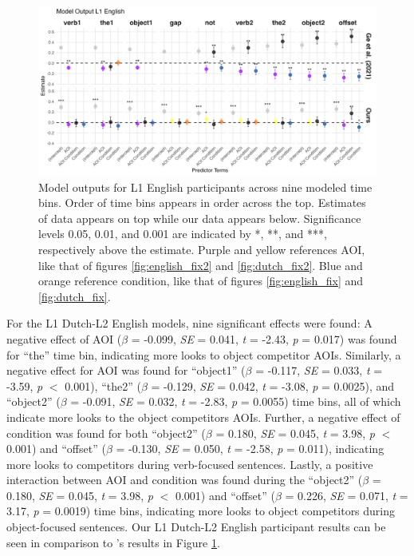 \begin{figure}[H]  %
    \centering
    \includegraphics[width=\textwidth,height=\textheight,keepaspectratio]{viz/model_plot_english.png}
    \caption{Model outputs for L1 English participants across nine modeled time bins. Order of time bins appears in order across the top. Estimates of \textcite{ge2021a} data appears on top while our data appears below. Significance levels 0.05, 0.01, and 0.001 are indicated by *, **, and ***, respectively above the estimate. Purple and yellow references AOI, like that of figures \ref{fig:english_fix2} and \ref{fig:dutch_fix2}. Blue and orange reference condition, like that of figures \ref{fig:english_fix} and \ref{fig:dutch_fix}.}
    \label{fig:model_plot_english}
\end{figure}

For the L1 Dutch-L2 English models, nine significant effects were found: A negative effect of AOI ($\beta$ = -0.099, \textit{SE} = 0.041, \textit{t} = -2.43, \textit{p} = 0.017) was found for “the” time bin, indicating more looks to object competitor AOIs. Similarly, a negative effect for AOI was found for “object1” ($\beta$ = -0.117, \textit{SE} = 0.033, \textit{t} = -3.59, \textit{p} $<$ 0.001), “the2” ($\beta$ = -0.129, \textit{SE} = 0.042, \textit{t} = -3.08, \textit{p} = 0.0025), and “object2” ($\beta$ = -0.091, \textit{SE} = 0.032, \textit{t} = -2.83, \textit{p} = 0.0055) time bins, all of which indicate more looks to the object competitors AOIs. Further, a negative effect of condition was found for both “object2” ($\beta$ = 0.180, \textit{SE} = 0.045, \textit{t} = 3.98, \textit{p} $<$ 0.001) and “offset” ($\beta$ = -0.130, \textit{SE} = 0.050, \textit{t} = -2.58, \textit{p} = 0.011), indicating more looks to competitors during verb-focused sentences. Lastly, a positive interaction between AOI and condition was found during the “object2” ($\beta$ = 0.180, \textit{SE} = 0.045, \textit{t} = 3.98, \textit{p} $<$ 0.001) and “offset” ($\beta$ = 0.226, \textit{SE} = 0.071, \textit{t} = 3.17, \textit{p} = 0.0019) time bins, indicating more looks to object competitors during object-focused sentences. Our L1 Dutch-L2 English participant results can be seen in comparison to \textcite{ge2021a}'s results in Figure \ref{fig:model_plot_english}.


